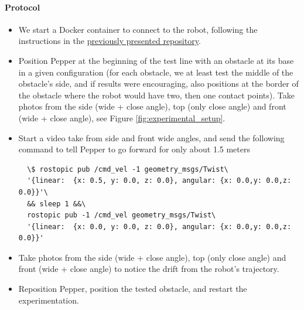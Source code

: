 \paragraph{Protocol}

\begin{itemize}
  \item We start a Docker container to connect to the robot, following the instructions in the \href{https://github.com/Xia0ben/rosdocked-kinetic-pepper}{previously presented repository}.
  \item Position Pepper at the beginning of the test line with an obstacle at its base in a given configuration (for each obstacle, we at least test the middle of the obstacle's side, and if results were encouraging, also positions at the border of the obstacle where the robot would have two, then one contact points). Take photos from the side (wide + close angle), top (only close angle) and front (wide + close angle), see Figure \ref{fig:experimental_setup}.
  \item Start a video take from side and front wide angles, and send the following command to tell Pepper to go forward for only about 1.5 meters
  \begin{verbatim}
  \$ rostopic pub /cmd_vel -1 geometry_msgs/Twist\
  '{linear:  {x: 0.5, y: 0.0, z: 0.0}, angular: {x: 0.0,y: 0.0,z: 0.0}}'\
  && sleep 1 &&\
  rostopic pub -1 /cmd_vel geometry_msgs/Twist\
  '{linear:  {x: 0.0, y: 0.0, z: 0.0}, angular: {x: 0.0,y: 0.0,z: 0.0}}'
  \end{verbatim}
  \item Take photos from the side (wide + close angle), top (only close angle) and front (wide + close angle) to notice the drift from the robot's trajectory.
  \item Reposition Pepper, position the tested obstacle, and restart the experimentation.
\end{itemize}

